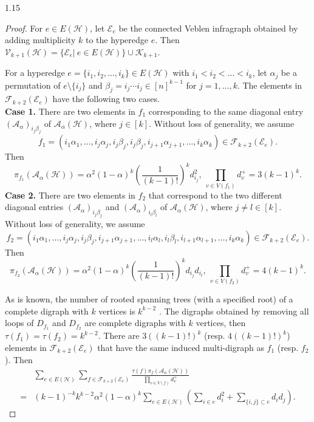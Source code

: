\documentclass[preprint,12pt]{elsarticle1}
\numberwithin{equation}{section}
\begin{document}
\begin{spacing}{1.15}
\begin{proof}
For $e\in E(\mathcal{H})$, let $\mathcal{E}_{e}$ be the connected Veblen infragraph obtained by adding multiplicity $k$ to the hyperedge $e$.
Then $\mathcal{V}_{k+1}(\mathcal{H})=\{\mathcal{E}_{e}|\ e\in E(\mathcal{H})\}\cup\mathcal{K}_{k+1}$.

For a hyperedge $e=\{i_1,i_2,\ldots,i_k\}\in E(\mathcal{H})$ with $i_1<i_2<\ldots<i_k$, let $\alpha_{j}$ be a permutation of $e\setminus\{i_j\}$ and $\beta_{j}=i_j \cdots i_j\in[n]^{k-1}$ for $j=1,\ldots,k$.
The elements in $\mathcal{F}_{k+2}(\mathcal{E}_e)$ have the following two cases.\\
\textbf{Case 1.}
There are two elements in $f_1$ corresponding to the same diagonal entry $(\mathcal{A}_{\alpha})_{i_j \beta_j}$ of $\mathcal{A}_{\alpha}(\mathcal{H})$, where $j\in[k]$.
Without loss of generality, we assume $$f_1=(i_1\alpha_1,\ldots,i_j\alpha_j,i_j\beta_j,i_j\beta_j,i_{j+1}\alpha_{j+1},\ldots,i_k\alpha_k)\in\mathcal{F}_{k+2}(\mathcal{E}_e).$$
Then $$\pi_{f_1}(\mathcal{A}_{\alpha}(\mathcal{H}))=\alpha^{2}(1-\alpha)^{k} \left( \frac{1}{(k-1)!} \right)^{k}d_{i_j}^{2},~ \prod_{v\in V(f_1)}d_v^{+}=3(k-1)^k.$$
\textbf{Case 2.}
There are two elements in $f_2$ that correspond to the two different diagonal entries $(\mathcal{A}_{\alpha})_{i_j \beta_j}$ and $(\mathcal{A}_{\alpha})_{i_l \beta_l}$ of $\mathcal{A}_{\alpha}(\mathcal{H})$, where $j\ne l\in[k]$.
Without loss of generality, we assume $$f_2=(i_1\alpha_1,\ldots,i_j\alpha_j,i_j\beta_j,i_{j+1}\alpha_{j+1},\ldots,i_l\alpha_l, i_l\beta_l,i_{l+1}\alpha_{l+1},\ldots,i_k\alpha_k)\in\mathcal{F}_{k+2}(\mathcal{E}_e).$$
Then $$\pi_{f_2}(\mathcal{A}_{\alpha}(\mathcal{H}))=\alpha^{2}(1-\alpha)^{k}\left( \frac{1}{(k-1)!} \right)^{k}d_{i_j}d_{i_l},~ \prod_{v\in V(f_2)}d_v^{+}=4(k-1)^k.$$

As is known, the number of rooted spanning trees (with a specified root) of a complete digraph with $k$ vertices is $k^{k-2}$ \cite{Cayley}.
The digraphs obtained by removing all loops of $D_{f_1}$ and $D_{f_2}$ are complete digraphs with $k$ vertices, then $\tau(f_1)=\tau(f_2)=k^{k-2}$.
There are $3((k-1)!)^{k}$ (resp. $4((k-1)!)^{k}$) elements in $\mathcal{F}_{k+2}(\mathcal{E}_e)$ that have the same induced multi-digraph as $f_1$ (resp. $f_2$). Then
\begin{equation}\label{edges}
\begin{aligned}
&\sum\limits_{e\in E(\mathcal{H})}\sum\limits_{f\in\mathcal{F}_{k+2}(\mathcal{E}_{e})}\frac{\tau(f) \pi_{f}(\mathcal{A}_{\alpha}(\mathcal{H}))}{\prod\limits_{v\in V(f)}d_v^{+}}\\
=&(k-1)^{-k}k^{k-2}\alpha^{2}(1-\alpha)^{k}\sum\limits_{e\in E(\mathcal{H})}\left( \sum\limits_{i\in e}d_i^2+\sum\limits_{\{i,j\}\subset e}d_i d_j \right).
\end{aligned}
\end{equation}


\end{proof}
\end{spacing}
\end{document}
